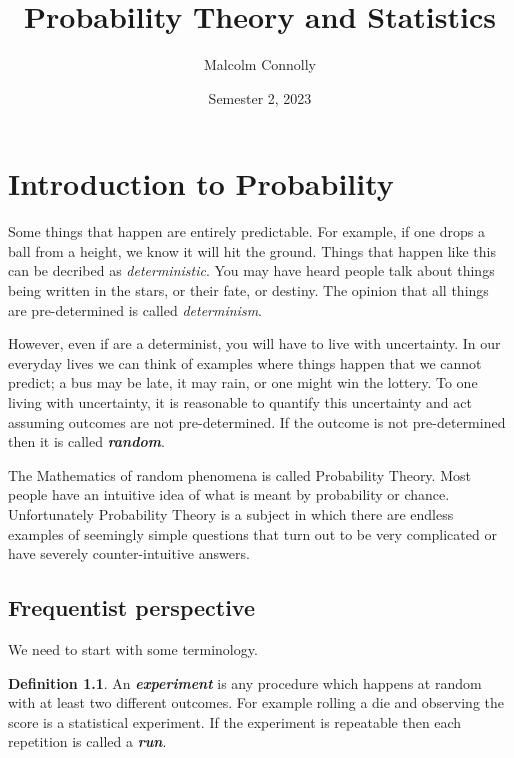 \documentclass[
]{book}
\title{Probability Theory and Statistics}
\author{Malcolm Connolly}
\date{Semester 2, 2023}
\theoremstyle{definition}
\newtheorem{definition}{Definition}[chapter]
\theoremstyle{definition}
\theoremstyle{definition}
\theoremstyle{definition}
\theoremstyle{remark}
\begin{document}
\maketitle

{
\setcounter{tocdepth}{1}
\tableofcontents
}
\hypertarget{intro}{%
\chapter{Introduction to Probability}\label{intro}}

Some things that happen are entirely predictable. For example, if one drops a ball from a height, we know it will hit the ground. Things that happen like this can be decribed as \emph{deterministic}. You may have heard people talk about things being written in the stars, or their fate, or destiny. The opinion that all things are pre-determined is called \emph{determinism}.

However, even if are a determinist, you will have to live with uncertainty. In our everyday lives we can think of examples where things happen that we cannot predict; a bus may be late, it may rain, or one might win the lottery. To one living with uncertainty, it is reasonable to quantify this uncertainty and act assuming outcomes are not pre-determined. If the outcome is not pre-determined then it is called \textbf{\emph{random}}.

The Mathematics of random phenomena is called Probability Theory. Most people have an intuitive idea of what is meant by probability or chance. Unfortunately Probability Theory is a subject in which there are endless examples of seemingly simple questions that turn out to be very complicated or have severely counter-intuitive answers.

\hypertarget{frequentist-perspective}{%
\section{Frequentist perspective}\label{frequentist-perspective}}

We need to start with some terminology.

\begin{definition}
\protect\hypertarget{def:experiment}{}\label{def:experiment}An \textbf{\emph{experiment}} is any procedure which happens at random with at least two different outcomes. For example rolling a die and observing the score is a statistical experiment. If the experiment is repeatable then each repetition is called a \textbf{\emph{run}}.
\end{definition}
\end{document}
